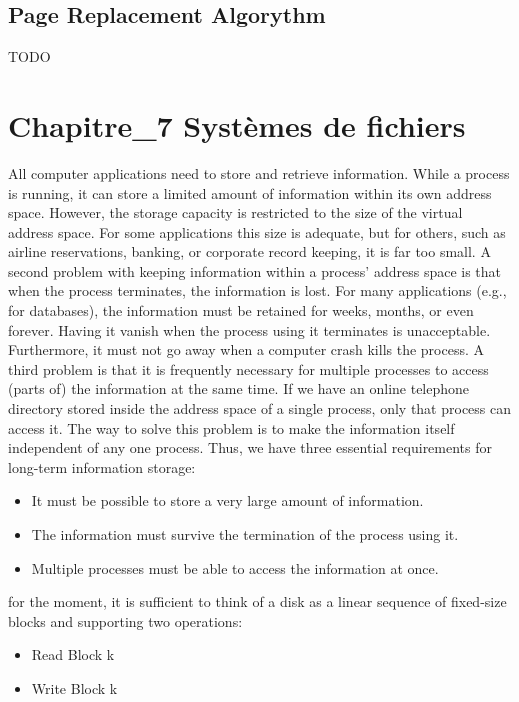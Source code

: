 \subsection{Page Replacement Algorythm}
TODO
\newpage
\section{Chapitre\_7 Systèmes de fichiers}%

All computer applications need to store and retrieve information. While a process is running, it can store a limited amount of information within its own address space. However, the storage capacity is restricted to the size of the virtual address space. For some applications this size is adequate, but for others, such as airline reservations, banking, or corporate record keeping, it is far too small. A second problem with keeping information within a process’ address space is that when the process terminates, the information is lost. For many applications (e.g., for databases), the information must be retained for weeks, months, or even forever. Having it vanish when the process using it terminates is unacceptable. Furthermore, it must not go away when a computer crash kills the process. A third problem is that it is frequently necessary for multiple processes to access (parts of) the information at the same time. If we have an online telephone directory stored inside the address space of a single process, only that process can access it. The way to solve this problem is to make the information itself independent of any one process. Thus, we have three essential requirements for long-term information storage:
\begin{itemize}
    \item It must be possible to store a very large amount of information.
    \item The information must survive the termination of the process using it.
    \item Multiple processes must be able to access the information at once.
\end{itemize}
for the moment, it is sufficient to think of a disk as a linear sequence of fixed-size blocks and supporting two operations:
\begin{itemize}
    \item Read Block k
    \item Write Block k
\end{itemize}

